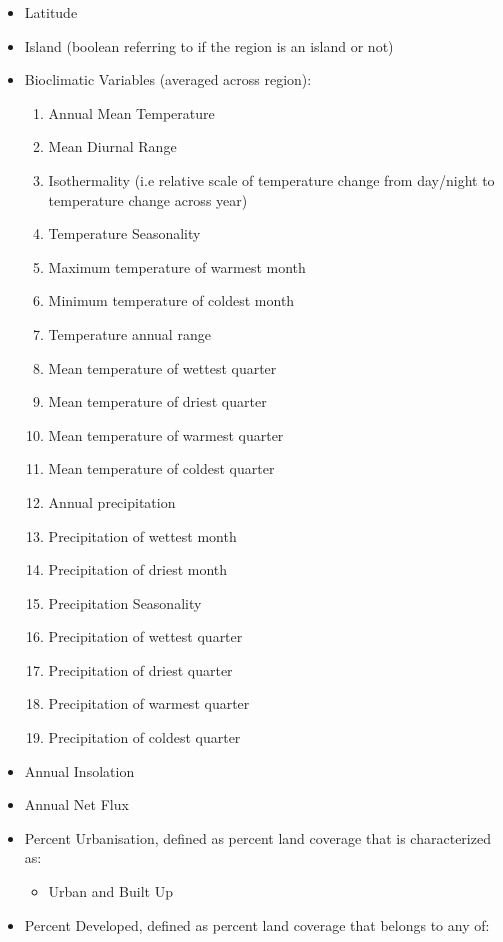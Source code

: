 \documentclass[prl,showpacs,superscriptaddress,twocolumn,longbibliography]{revtex4-1}
\begin{document}
\begin{itemize}
\item Latitude
\item Island (boolean referring to if the region is an island or not)
\item Bioclimatic Variables (averaged across region)\cite{fick_worldclim_2017}:
\begin{enumerate}
	\item Annual Mean Temperature
	\item Mean Diurnal Range
	\item Isothermality (i.e relative scale of temperature change from day/night to temperature change across year)
	\item Temperature Seasonality
	\item Maximum temperature of warmest month
	\item Minimum temperature of coldest month
	\item Temperature annual range
	\item Mean temperature of wettest quarter
	\item Mean temperature of driest quarter
	\item Mean temperature of warmest quarter
	\item Mean temperature of coldest quarter
	\item Annual precipitation
	\item Precipitation of wettest month
	\item Precipitation of driest month
	\item Precipitation Seasonality
	\item Precipitation of wettest quarter
	\item Precipitation of driest quarter
	\item Precipitation of warmest quarter
	\item Precipitation of coldest quarter
\end{enumerate}
\item Annual Insolation\cite{nasa_insol}
\item Annual Net Flux\cite{nasa_netflux}
\item Percent Urbanisation, defined as percent land coverage that is characterized as:
\begin{itemize}
	\item Urban and Built Up\cite{nasa_landcov}
\end{itemize}
\item Percent Developed, defined as percent land coverage that belongs to any of:

\end{itemize}
\end{document}
